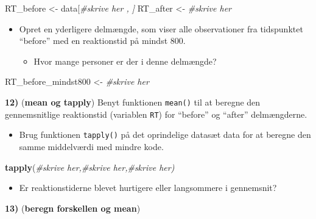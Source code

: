 \documentclass[
]{book}
\newenvironment{Shaded}{\begin{snugshade}}{\end{snugshade}}
\newcommand{\CommentTok}[1]{\textcolor[rgb]{0.37,0.37,0.37}{\textit{#1}}}
\newcommand{\FunctionTok}[1]{\textcolor[rgb]{0.27,0.27,0.27}{\textbf{#1}}}
\newcommand{\NormalTok}[1]{#1}
\newcommand{\OtherTok}[1]{\textcolor[rgb]{0.37,0.37,0.37}{#1}}
\providecommand{\tightlist}{%
  \setlength{\itemsep}{0pt}\setlength{\parskip}{0pt}}
\begin{document}
\begin{Shaded}
\begin{Highlighting}[]
\NormalTok{RT\_before }\OtherTok{\textless{}{-}}\NormalTok{ data[}\CommentTok{\#skrive her , ]}
\NormalTok{RT\_after }\OtherTok{\textless{}{-}} \CommentTok{\#skrive her}
\end{Highlighting}
\end{Shaded}

\begin{itemize}
\tightlist
\item
  Opret en yderligere delmængde, som viser alle observationer fra tidspunktet ``before'' med en reaktionstid på mindst 800.

  \begin{itemize}
  \tightlist
  \item
    Hvor mange personer er der i denne delmængde?
  \end{itemize}
\end{itemize}

\begin{Shaded}
\begin{Highlighting}[]
\NormalTok{RT\_before\_mindst800 }\OtherTok{\textless{}{-}} \CommentTok{\#skrive her}
\end{Highlighting}
\end{Shaded}

\textbf{12)} (\textbf{mean og tapply}) Benyt funktionen \texttt{mean()} til at beregne den gennemsnitlige reaktionstid (variablen \texttt{RT}) for ``before'' og ``after'' delmængderne.

\begin{itemize}
\tightlist
\item
  Brug funktionen \texttt{tapply()} på det oprindelige datasæt data for at beregne den samme middelværdi med mindre kode.
\end{itemize}

\begin{Shaded}
\begin{Highlighting}[]
\FunctionTok{tapply}\NormalTok{(}\CommentTok{\#skrive her,\#skrive her,\#skrive her)}
\end{Highlighting}
\end{Shaded}

\begin{itemize}
\tightlist
\item
  Er reaktionstiderne blevet hurtigere eller langsommere i gennemsnit?
\end{itemize}

\textbf{13)} (\textbf{beregn forskellen og mean})
\end{document}

